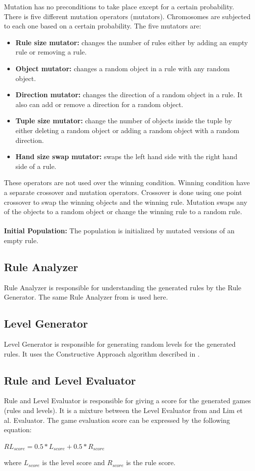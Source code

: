 Mutation has no preconditions to take place except for a certain probability. There is five different mutation operators (mutators). Chromosomes are subjected to each one based on a certain probability. The five mutators are:
\begin{itemize} \itemsep0pt \parskip0pt 
	\item \textbf{Rule size mutator:} changes the number of rules either by adding an empty rule or removing a rule.
	\item \textbf{Object mutator:} changes a random object in a rule with any random object.
	\item \textbf{Direction mutator:} changes the direction of a random object in a rule. It also can add or remove a direction for a random object.
	\item \textbf{Tuple size mutator:} change the number of objects inside the tuple by either deleting a random object or adding a random object with a random direction.
	\item \textbf{Hand size swap mutator:} swaps the left hand side with the right hand side of a rule.
\end{itemize}

These operators are not used over the winning condition. Winning condition have a separate crossover and mutation operators. Crossover is done using one point crossover to swap the winning objects and the winning rule. Mutation swaps any of the objects to a random object or change the winning rule to a random rule.\\\\
\textbf{Initial Population:} The population is initialized by mutated versions of an empty rule.

\subsection{Rule Analyzer}
Rule Analyzer is responsible for understanding the generated rules by the Rule Generator. The same Rule Analyzer from  is used here.

\subsection{Level Generator}
Level Generator is responsible for generating random levels for the generated rules. It uses the Constructive Approach algorithm described in .

\subsection{Rule and Level Evaluator}
Rule and Level Evaluator is responsible for giving a score for the generated games (rules and levels). It is a mixture between the Level Evaluator from  and Lim et al.\cite{puzzleScriptGeneration} Evaluator. The game evaluation score can be expressed by the following equation:
\begin{center}
$RL_{score} = 0.5 * L_{score} + 0.5 * R_{score}$
\end{center}
where $L_{score}$ is the level score and $R_{score}$ is the rule score.


